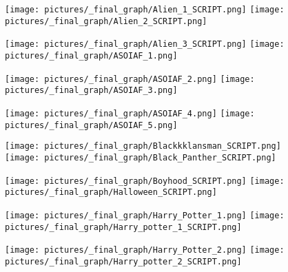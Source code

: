 \begin{figure}
        \centering
        \texttt{[image: pictures/\_final\_graph/Alien\_1\_SCRIPT.png]}
        \texttt{[image: pictures/\_final\_graph/Alien\_2\_SCRIPT.png]}
\end{figure}
\begin{figure} \ContinuedFloat
        \centering
        \texttt{[image: pictures/\_final\_graph/Alien\_3\_SCRIPT.png]}
        \texttt{[image: pictures/\_final\_graph/ASOIAF\_1.png]}
\end{figure}
\begin{figure} \ContinuedFloat
        \centering
        \texttt{[image: pictures/\_final\_graph/ASOIAF\_2.png]}
        \texttt{[image: pictures/\_final\_graph/ASOIAF\_3.png]}
\end{figure}
\begin{figure} \ContinuedFloat
        \centering
        \texttt{[image: pictures/\_final\_graph/ASOIAF\_4.png]}
        \texttt{[image: pictures/\_final\_graph/ASOIAF\_5.png]}
\end{figure}
\begin{figure} \ContinuedFloat
        \centering
        \texttt{[image: pictures/\_final\_graph/Blackkklansman\_SCRIPT.png]}
        \texttt{[image: pictures/\_final\_graph/Black\_Panther\_SCRIPT.png]}
\end{figure}
\begin{figure} \ContinuedFloat
        \centering
        \texttt{[image: pictures/\_final\_graph/Boyhood\_SCRIPT.png]}
        \texttt{[image: pictures/\_final\_graph/Halloween\_SCRIPT.png]}
\end{figure}
\begin{figure} \ContinuedFloat
        \centering
        \texttt{[image: pictures/\_final\_graph/Harry\_Potter\_1.png]}
        \texttt{[image: pictures/\_final\_graph/Harry\_potter\_1\_SCRIPT.png]}
\end{figure}
\begin{figure} \ContinuedFloat
        \centering
        \texttt{[image: pictures/\_final\_graph/Harry\_Potter\_2.png]}
        \texttt{[image: pictures/\_final\_graph/Harry\_potter\_2\_SCRIPT.png]}
\end{figure}

